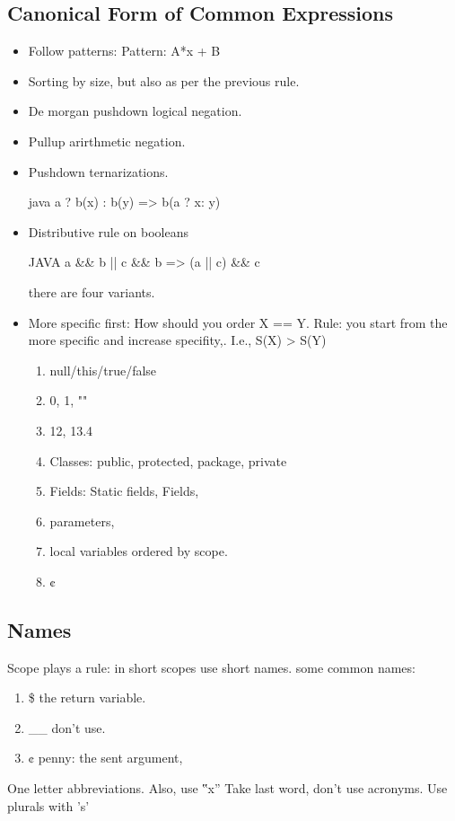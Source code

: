 \subsection{Canonical Form of Common Expressions}
\begin{itemize}
  \item Follow patterns: Pattern: A*x + B
  \item Sorting by size, but also as per the previous rule.
  \item De morgan pushdown logical negation.
  \item Pullup arirthmetic negation.
  \item Pushdown ternarizations.
  \begin{code}{java}
   a ? b(x) : b(y) => b(a ? x: y)
  \end{code}
  \item Distributive rule on booleans
    \begin{code}{JAVA}
a && b || c && b => (a || c) && c
    \end{code}
      there are four variants.
  \item More specific first: How should you order X == Y.
        Rule: you start from the more specific and increase specifity,.
        I.e., S(X) > S(Y)

        \begin{enumerate}
          \item null/this/true/false
          \item 0, 1, ""
          \item 12, 13.4
          \item Classes: public, protected, package, private
          \item Fields: Static fields, Fields,
          \item parameters,
          \item local variables ordered by scope.
          \item ¢
        \end{enumerate}
\end{itemize}

\subsection{Names}
Scope plays a rule:
in short scopes use short names.
some common names:
\begin{enumerate}
  \item \$ the return variable.
  \item \_\_ don't use.
  \item ¢ penny: the sent argument,
\end{enumerate}
One letter abbreviations.
Also, use ‟x”
Take last word, don't use acronyms.
Use plurals with 's'

